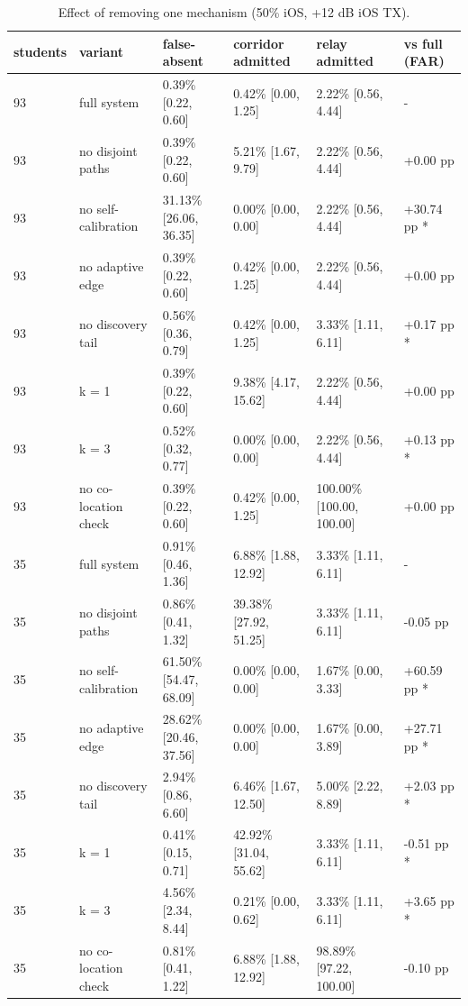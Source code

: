 \begin{table}[t]
\centering
\caption{Effect of removing one mechanism (50\% iOS, +12 dB iOS TX).}\label{tab:e02}
\begin{tabular}{llllll}
\toprule
students & variant & false-absent & corridor admitted & relay admitted & vs full (FAR) \\
\midrule
93 & full system & 0.39\% [0.22, 0.60] & 0.42\% [0.00, 1.25] & 2.22\% [0.56, 4.44] & - \\
93 & no disjoint paths & 0.39\% [0.22, 0.60] & 5.21\% [1.67, 9.79] & 2.22\% [0.56, 4.44] & +0.00 pp \\
93 & no self-calibration & 31.13\% [26.06, 36.35] & 0.00\% [0.00, 0.00] & 2.22\% [0.56, 4.44] & +30.74 pp * \\
93 & no adaptive edge & 0.39\% [0.22, 0.60] & 0.42\% [0.00, 1.25] & 2.22\% [0.56, 4.44] & +0.00 pp \\
93 & no discovery tail & 0.56\% [0.36, 0.79] & 0.42\% [0.00, 1.25] & 3.33\% [1.11, 6.11] & +0.17 pp * \\
93 & k = 1 & 0.39\% [0.22, 0.60] & 9.38\% [4.17, 15.62] & 2.22\% [0.56, 4.44] & +0.00 pp \\
93 & k = 3 & 0.52\% [0.32, 0.77] & 0.00\% [0.00, 0.00] & 2.22\% [0.56, 4.44] & +0.13 pp * \\
93 & no co-location check & 0.39\% [0.22, 0.60] & 0.42\% [0.00, 1.25] & 100.00\% [100.00, 100.00] & +0.00 pp \\
35 & full system & 0.91\% [0.46, 1.36] & 6.88\% [1.88, 12.92] & 3.33\% [1.11, 6.11] & - \\
35 & no disjoint paths & 0.86\% [0.41, 1.32] & 39.38\% [27.92, 51.25] & 3.33\% [1.11, 6.11] & -0.05 pp \\
35 & no self-calibration & 61.50\% [54.47, 68.09] & 0.00\% [0.00, 0.00] & 1.67\% [0.00, 3.33] & +60.59 pp * \\
35 & no adaptive edge & 28.62\% [20.46, 37.56] & 0.00\% [0.00, 0.00] & 1.67\% [0.00, 3.89] & +27.71 pp * \\
35 & no discovery tail & 2.94\% [0.86, 6.60] & 6.46\% [1.67, 12.50] & 5.00\% [2.22, 8.89] & +2.03 pp * \\
35 & k = 1 & 0.41\% [0.15, 0.71] & 42.92\% [31.04, 55.62] & 3.33\% [1.11, 6.11] & -0.51 pp * \\
35 & k = 3 & 4.56\% [2.34, 8.44] & 0.21\% [0.00, 0.62] & 3.33\% [1.11, 6.11] & +3.65 pp * \\
35 & no co-location check & 0.81\% [0.41, 1.22] & 6.88\% [1.88, 12.92] & 98.89\% [97.22, 100.00] & -0.10 pp \\
\bottomrule
\end{tabular}
\end{table}
